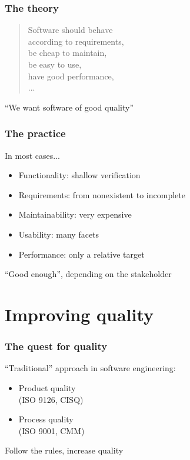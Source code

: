 \documentclass[17pt,aspectratio=169,hyperref=pdfusetitle]{beamer}
\begin{document}
\begin{frame}[fragile]
  \frametitle{The theory}

  {\em
    \begin{quote}
      Software should behave \\
      according to requirements, \\
      be cheap to maintain, \\
      be easy to use, \\
      have good performance, \\
      ... \\
      \end{quote}
  }

  {\large
  ``We want software of good quality''
  }
\end{frame}

\begin{frame}[fragile]
  \frametitle{The practice}

  In most cases...
  
  \begin{itemize}
  \item Functionality: shallow verification
  \item Requirements: from nonexistent to incomplete
  \item Maintainability: very expensive
  \item Usability: many facets
  \item Performance: only a relative target
  \end{itemize}

  ``Good enough'', depending on the stakeholder
  
\end{frame}

\section{Improving quality}

\begin{frame}[fragile]
  \frametitle{The quest for quality}

  ``Traditional'' approach in software engineering:
  
  \begin{itemize}
  \item Product quality \\
    (ISO 9126, CISQ)
  \item Process quality \\
    (ISO 9001, CMM)
  \end{itemize}

  Follow the rules, increase quality
\end{frame}
\end{document}
